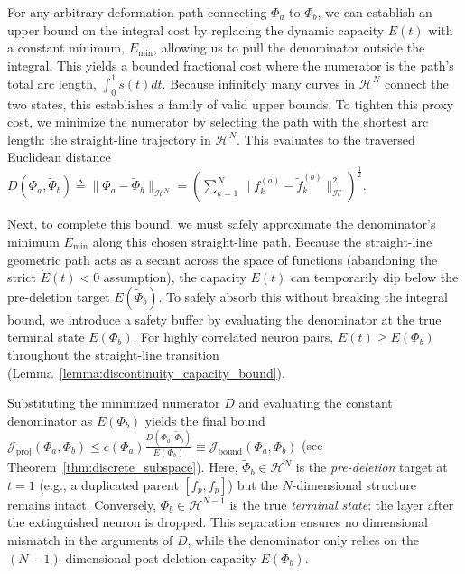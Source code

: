 \documentclass[11pt, a4paper, copyright, gdm]{google}
\newcommand{\normshort}[1]{\lVert#1\rVert}
\newcommand{\calH}{\mathcal{H}}
\newcommand{\calJ}{\mathcal{J}}
\theoremstyle{definition}
\begin{document}
For any arbitrary deformation path connecting $\Phi_a$ to $\Phi_b$, we can establish an upper bound on the integral cost by replacing the dynamic capacity $E(t)$ with a constant minimum, $E_{\min}$, allowing us to pull the denominator outside the integral. This yields a bounded fractional cost where the numerator is the path's total arc length, $\int_{0}^{1} \dot{s}(t) dt$. Because infinitely many curves in $\calH^N$ connect the two states, this establishes a family of valid upper bounds. To tighten this proxy cost, we minimize the numerator by selecting the path with the shortest arc length: the straight-line trajectory in $\calH^N$. This evaluates to the traversed Euclidean distance $D(\Phi_a, \tilde{\Phi}_b) \triangleq \normshort{\Phi_a - \tilde{\Phi}_b}_{\calH^N} = ( \sum_{k=1}^N \normshort{f_k^{(a)} - \tilde{f}_k^{(b)}}_{\calH}^2 )^\frac{1}{2}$.

Next, to complete this bound, we must safely approximate the denominator's minimum $E_{\min}$ along this chosen straight-line path. Because the straight-line geometric path acts as a secant across the space of functions (abandoning the strict $\dot{E}(t) < 0$ assumption), the capacity $E(t)$ can temporarily dip below the pre-deletion target $E(\tilde{\Phi}_b)$. To safely absorb this without breaking the integral bound, we introduce a safety buffer by evaluating the denominator at the true terminal state $E(\Phi_b)$. For highly correlated neuron pairs, $E(t) \geq E(\Phi_b)$ throughout the straight-line transition (Lemma~\ref{lemma:discontinuity_capacity_bound}).

Substituting the minimized numerator $D$ and evaluating the constant denominator as $E(\Phi_b)$ yields the final bound $\calJ_{\text{proj}}(\Phi_a, \Phi_b) \le c(\Phi_a) \frac{D(\Phi_a, \tilde{\Phi}_b)}{E(\Phi_b)} \equiv \calJ_{\text{bound}}(\Phi_a, \Phi_b)$ (see Theorem~\ref{thm:discrete_subspace}). Here, $\tilde{\Phi}_b \in \calH^N$ is the \textit{pre-deletion} target at $t=1$ (e.g., a duplicated parent $[f_p, f_p]$) but the $N$-dimensional structure remains intact. Conversely, $\Phi_b \in \calH^{N-1}$ is the true \textit{terminal state}: the layer after the extinguished neuron is dropped. This separation ensures no dimensional mismatch in the arguments of $D$, while the denominator only relies on the $(N-1)$-dimensional post-deletion capacity $E(\Phi_b)$.
\end{document}
